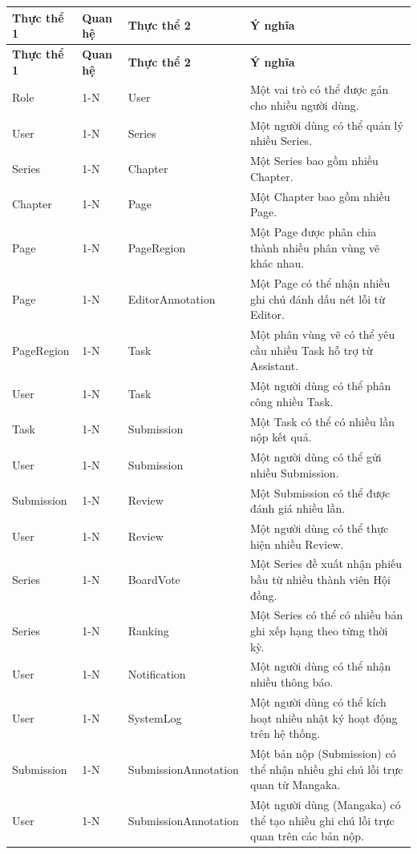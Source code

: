 \renewcommand{\arraystretch}{1.3}
\begin{longtable}{|p{2.1cm}|p{1.4cm}|p{4.3cm}|>{\raggedright\arraybackslash}p{5.8cm}|}
\hline
\rowcolor{tableheader}
\textbf{Thực thể 1} & \textbf{Quan hệ} & \textbf{Thực thể 2} & \textbf{Ý nghĩa} \\ \hline
\endfirsthead
\hline
\rowcolor{tableheader}
\textbf{Thực thể 1} & \textbf{Quan hệ} & \textbf{Thực thể 2} & \textbf{Ý nghĩa} \\ \hline
\endhead
Role & 1-N & User & Một vai trò có thể được gán cho nhiều người dùng. \\ \hline
User & 1-N & Series & Một người dùng có thể quản lý nhiều Series. \\ \hline
Series & 1-N & Chapter & Một Series bao gồm nhiều Chapter. \\ \hline
Chapter & 1-N & Page & Một Chapter bao gồm nhiều Page. \\ \hline
Page & 1-N & PageRegion & Một Page được phân chia thành nhiều phân vùng vẽ khác nhau. \\ \hline
Page & 1-N & EditorAnnotation & Một Page có thể nhận nhiều ghi chú đánh dấu nét lỗi từ Editor. \\ \hline
PageRegion & 1-N & Task & Một phân vùng vẽ có thể yêu cầu nhiều Task hỗ trợ từ Assistant. \\ \hline
User & 1-N & Task & Một người dùng có thể phân công nhiều Task. \\ \hline
Task & 1-N & Submission & Một Task có thể có nhiều lần nộp kết quả. \\ \hline
User & 1-N & Submission & Một người dùng có thể gửi nhiều Submission. \\ \hline
Submission & 1-N & Review & Một Submission có thể được đánh giá nhiều lần. \\ \hline
User & 1-N & Review & Một người dùng có thể thực hiện nhiều Review. \\ \hline
Series & 1-N & BoardVote & Một Series đề xuất nhận phiếu bầu từ nhiều thành viên Hội đồng. \\ \hline
Series & 1-N & Ranking & Một Series có thể có nhiều bản ghi xếp hạng theo từng thời kỳ. \\ \hline
User & 1-N & Notification & Một người dùng có thể nhận nhiều thông báo. \\ \hline
User & 1-N & SystemLog & Một người dùng có thể kích hoạt nhiều nhật ký hoạt động trên hệ thống. \\ \hline
Submission & 1-N & SubmissionAnnotation & Một bản nộp (Submission) có thể nhận nhiều ghi chú lỗi trực quan từ Mangaka. \\ \hline
User & 1-N & SubmissionAnnotation & Một người dùng (Mangaka) có thể tạo nhiều ghi chú lỗi trực quan trên các bản nộp. \\ \hline
\end{longtable}
\vspace{0.5cm}
